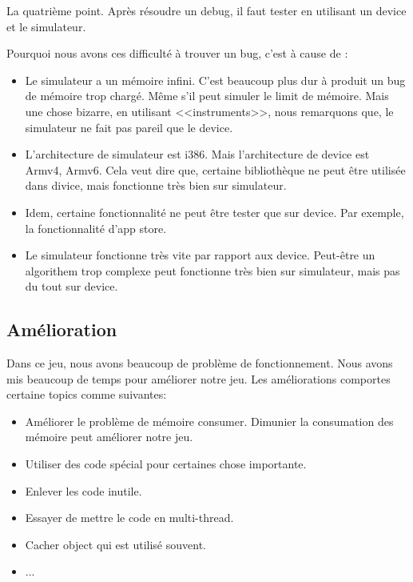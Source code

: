La quatrième point. Après résoudre un debug, il faut tester en utilisant un device et le simulateur. 

Pourquoi nous avons ces difficulté à trouver un bug, c'est à cause de :

\begin{itemize}
	\item Le simulateur a un mémoire infini. C'est beaucoup plus dur à produit un bug de mémoire trop chargé. Même s'il peut simuler le limit de mémoire. Mais une chose bizarre, en utilisant <<instruments>>, nous remarquons que, le simulateur ne fait pas pareil que le device. 
	\item L'architecture de simulateur est i386. Mais l'architecture de device est Armv4, Armv6. Cela veut dire que, certaine bibliothèque ne peut être utilisée dans divice, mais fonctionne très bien sur simulateur.
	\item Idem, certaine fonctionnalité ne peut être tester que sur device. Par exemple, la fonctionnalité d'app store. 
	\item Le simulateur fonctionne très vite par rapport aux device. Peut-être un algorithem trop complexe peut fonctionne très bien sur simulateur, mais pas du tout sur device. 
\end{itemize}


\subsection{Amélioration} %
\label{sub:amélioration}

Dans ce jeu, nous avons beaucoup de problème de fonctionnement. Nous avons mis beaucoup de temps pour améliorer notre jeu. Les améliorations comportes certaine topics comme suivantes:

\begin{itemize}
	\item Améliorer le problème de mémoire consumer. Dimunier la consumation des mémoire peut améliorer notre jeu. 
	\item Utiliser des code spécial pour certaines chose importante.
	\item Enlever les code inutile.
	\item Essayer de mettre le code en multi-thread.
	\item Cacher object qui est utilisé souvent.
	\item ...
\end{itemize}

